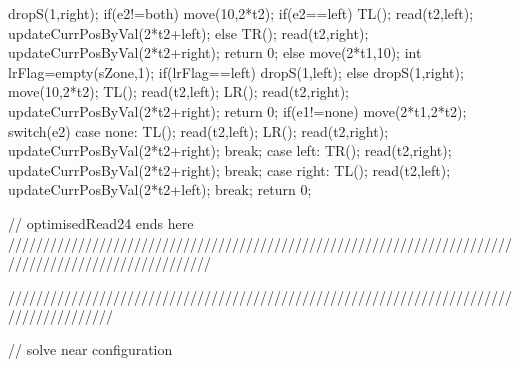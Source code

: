 {{{{{                        dropS(1,right);
                    if(e2!=both)
                    {
                        move(10,2*t2);
                        if(e2==left)
                        {
                            TL();
                            read(t2,left);
                            updateCurrPosByVal(2*t2+left);
                        }
                        else
                        {
                            TR();
                            read(t2,right);
                            updateCurrPosByVal(2*t2+right);
                        }
                    }
                    return 0;
                }
            }
            else
            {
                move(2*t1,10);
                int lrFlag=empty(sZone,1);
                if(lrFlag==left)
                {
                    dropS(1,left);
                }
                else
                    dropS(1,right);
                move(10,2*t2);
                TL();
                read(t2,left);
                LR();
                read(t2,right);
                updateCurrPosByVal(2*t2+right);
                return 0;
            }
        }
        if(e1!=none)
        {
            move(2*t1,2*t2);
        }
        switch(e2)
        {
            case none:
                TL();
                read(t2,left);
                LR();
                read(t2,right);
                updateCurrPosByVal(2*t2+right);
                break;
            case left:
                TR();
                read(t2,right);
                updateCurrPosByVal(2*t2+right);
                break;
            case right:
                TL();
                read(t2,left);
                updateCurrPosByVal(2*t2+left);
                break;
        }
    }
	return 0;
}

// optimisedRead24 ends here
/////////////////////////////////////////////////////////////////////////////////////////////////////



///////////////////////////////////////////////////////////////////////////////////////

// solve near configuration

